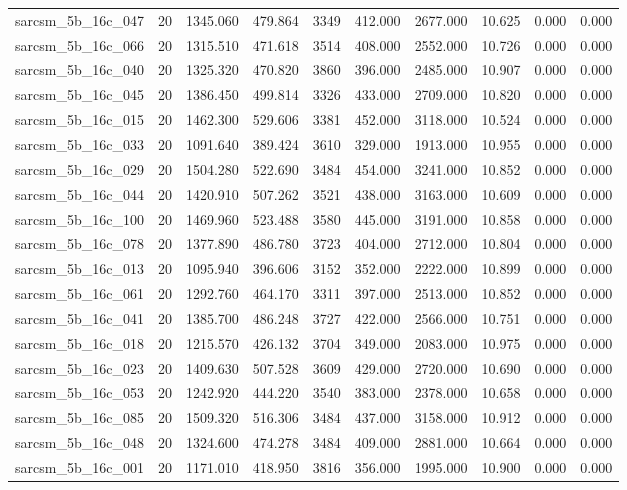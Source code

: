 \begin{tabular}{lrrrrrrrrr}
sarcsm\_5b\_16c\_047 & 20 & 1345.060 & 479.864 & 3349 & 412.000 & 2677.000 & 10.625 & 0.000 & 0.000 \\
sarcsm\_5b\_16c\_066 & 20 & 1315.510 & 471.618 & 3514 & 408.000 & 2552.000 & 10.726 & 0.000 & 0.000 \\
sarcsm\_5b\_16c\_040 & 20 & 1325.320 & 470.820 & 3860 & 396.000 & 2485.000 & 10.907 & 0.000 & 0.000 \\
sarcsm\_5b\_16c\_045 & 20 & 1386.450 & 499.814 & 3326 & 433.000 & 2709.000 & 10.820 & 0.000 & 0.000 \\
sarcsm\_5b\_16c\_015 & 20 & 1462.300 & 529.606 & 3381 & 452.000 & 3118.000 & 10.524 & 0.000 & 0.000 \\
sarcsm\_5b\_16c\_033 & 20 & 1091.640 & 389.424 & 3610 & 329.000 & 1913.000 & 10.955 & 0.000 & 0.000 \\
sarcsm\_5b\_16c\_029 & 20 & 1504.280 & 522.690 & 3484 & 454.000 & 3241.000 & 10.852 & 0.000 & 0.000 \\
sarcsm\_5b\_16c\_044 & 20 & 1420.910 & 507.262 & 3521 & 438.000 & 3163.000 & 10.609 & 0.000 & 0.000 \\
sarcsm\_5b\_16c\_100 & 20 & 1469.960 & 523.488 & 3580 & 445.000 & 3191.000 & 10.858 & 0.000 & 0.000 \\
sarcsm\_5b\_16c\_078 & 20 & 1377.890 & 486.780 & 3723 & 404.000 & 2712.000 & 10.804 & 0.000 & 0.000 \\
sarcsm\_5b\_16c\_013 & 20 & 1095.940 & 396.606 & 3152 & 352.000 & 2222.000 & 10.899 & 0.000 & 0.000 \\
sarcsm\_5b\_16c\_061 & 20 & 1292.760 & 464.170 & 3311 & 397.000 & 2513.000 & 10.852 & 0.000 & 0.000 \\
sarcsm\_5b\_16c\_041 & 20 & 1385.700 & 486.248 & 3727 & 422.000 & 2566.000 & 10.751 & 0.000 & 0.000 \\
sarcsm\_5b\_16c\_018 & 20 & 1215.570 & 426.132 & 3704 & 349.000 & 2083.000 & 10.975 & 0.000 & 0.000 \\
sarcsm\_5b\_16c\_023 & 20 & 1409.630 & 507.528 & 3609 & 429.000 & 2720.000 & 10.690 & 0.000 & 0.000 \\
sarcsm\_5b\_16c\_053 & 20 & 1242.920 & 444.220 & 3540 & 383.000 & 2378.000 & 10.658 & 0.000 & 0.000 \\
sarcsm\_5b\_16c\_085 & 20 & 1509.320 & 516.306 & 3484 & 437.000 & 3158.000 & 10.912 & 0.000 & 0.000 \\
sarcsm\_5b\_16c\_048 & 20 & 1324.600 & 474.278 & 3484 & 409.000 & 2881.000 & 10.664 & 0.000 & 0.000 \\
sarcsm\_5b\_16c\_001 & 20 & 1171.010 & 418.950 & 3816 & 356.000 & 1995.000 & 10.900 & 0.000 & 0.000 \\

\end{tabular}
